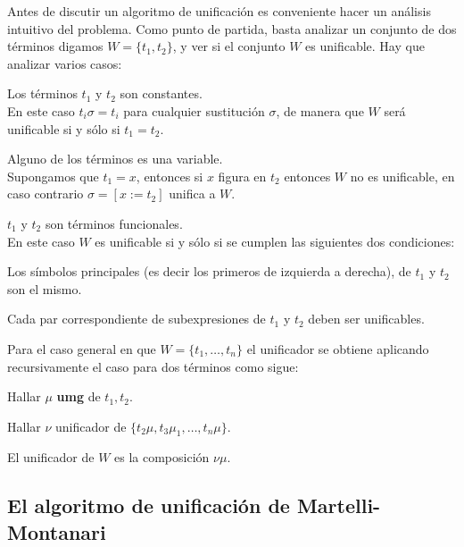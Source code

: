 \documentclass[11pt,letterpaper]{article}
\begin{document}
Antes de discutir un algoritmo de unificación es conveniente hacer un 
an\'alisis intuitivo del problema. Como punto de partida, basta analizar un 
conjunto de dos términos digamos $W=\{t_1,t_2\}$, y ver si el conjunto $W$ es unificable. 
Hay que analizar varios casos:
\be
 \item Los términos $t_1$ y $t_2$ son constantes. \\
  En este caso $t_i\sigma=t_i$ para cualquier sustituci\'on $\sigma$, de manera 
  que $W$ ser\'a unificable si y sólo si $t_1=t_2$.
 \item Alguno de los términos es una variable. \\
  Supongamos que $t_1=x$, entonces si $x$ figura en $t_2$ entonces $W$ no es 
  unificable, en caso contrario $\sigma=[x:=t_2]$ unifica a $W$. 
 \item $t_1$ y $t_2$ son términos funcionales. \\
  En este caso $W$ es unificable si y sólo si se cumplen las siguientes dos 
  condiciones:
  \be
   \item Los símbolos principales (es decir los primeros de izquierda a 
    derecha), de $t_1$ y $t_2$ son el mismo.  
   \item Cada par correspondiente de subexpresiones de $t_1$ y $t_2$ deben ser
    unificables. 
  \ee
\ee


Para el caso general en que $W=\{t_1,\ldots,t_n\}$ el unificador se obtiene 
aplicando recursivamente el caso para dos términos como sigue:
\bi
\item Hallar $\mu$ \textbf{umg} de $t_1,t_2$.
\item Hallar $\nu$ unificador de $\{t_2\mu,t_3\mu_1,\ldots,t_n\mu\}$.
\item El unificador de $W$ es la composición $\nu\mu$.
\ei

\subsection{El algoritmo de unificación de Martelli-Montanari}
\end{document}
